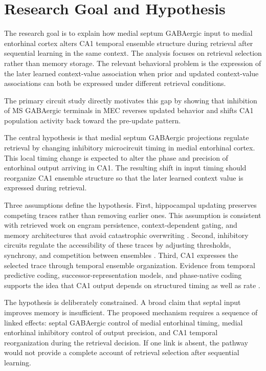 \section{Research Goal and Hypothesis}

The research goal is to explain how medial septum GABAergic input to medial entorhinal cortex alters CA1 temporal ensemble structure during retrieval after sequential learning in the same context. The analysis focuses on retrieval selection rather than memory storage. The relevant behavioral problem is the expression of the later learned context-value association when prior and updated context-value associations can both be expressed under different retrieval conditions.

The primary circuit study directly motivates this gap by showing that inhibition of MS GABAergic terminals in MEC reverses updated behavior and shifts CA1 population activity back toward the pre-update pattern.

The central hypothesis is that medial septum GABAergic projections regulate retrieval by changing inhibitory microcircuit timing in medial entorhinal cortex. This local timing change is expected to alter the phase and precision of entorhinal output arriving in CA1. The resulting shift in input timing should reorganize CA1 ensemble structure so that the later learned context value is expressed during retrieval.

Three assumptions define the hypothesis. First, hippocampal updating preserves competing traces rather than removing earlier ones. This assumption is consistent with retrieved work on engram persistence, context-dependent gating, and memory architectures that avoid catastrophic overwriting \cite{arxiv250601659,arxiv250102950,arxiv220200159}. Second, inhibitory circuits regulate the accessibility of these traces by adjusting thresholds, synchrony, and competition between ensembles \cite{arxiv170507614,arxiv181211581,arxiv231019614}. Third, CA1 expresses the selected trace through temporal ensemble organization. Evidence from temporal predictive coding, successor-representation models, and phase-native coding supports the idea that CA1 output depends on structured timing as well as rate \cite{arxiv230511982,arxiv200611975,arxiv260319690}.

The hypothesis is deliberately constrained. A broad claim that septal input improves memory is insufficient. The proposed mechanism requires a sequence of linked effects: septal GABAergic control of medial entorhinal timing, medial entorhinal inhibitory control of output precision, and CA1 temporal reorganization during the retrieval decision. If one link is absent, the pathway would not provide a complete account of retrieval selection after sequential learning.
